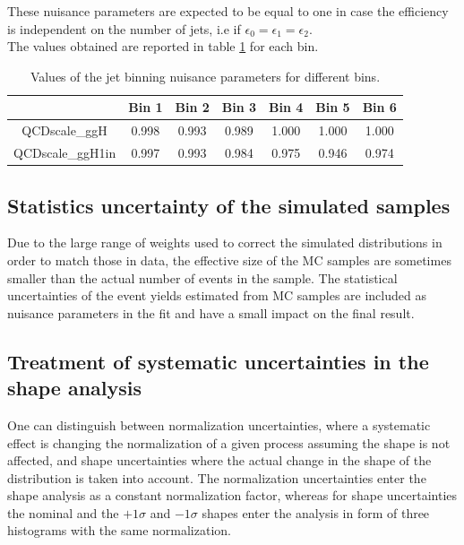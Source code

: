 These nuisance parameters are expected to be equal to one in case the efficiency is independent on the number of jets, i.e if $\epsilon_0 = \epsilon_1 = \epsilon_2$.\\
The values obtained are reported in table \ref{table:jet_binning_meas} for each \pth bin.

\begin{table}[h]
\caption{Values of the jet binning nuisance parameters for different \pth bins.}
\label{table:jet_binning_meas}
\begin{center}
\begin{tabular}{ccccccc}
& Bin 1 & Bin 2 & Bin 3 & Bin 4  & Bin 5 & Bin 6\\
\hline
QCDscale\_ggH  & 0.998  &   0.993  &   0.989  &   1.000  &   1.000   &  1.000 \\
QCDscale\_ggH1in &0.997   &  0.993  &   0.984  &   0.975 &    0.946 &    0.974  \\
\end{tabular}
\end{center}
\end{table}


\subsection{Statistics uncertainty of the simulated samples}

Due to the large range of weights used to correct the simulated distributions in order to
match those in data, the effective size of the MC samples are sometimes smaller than
the actual number of events in the sample.
The statistical uncertainties of the event yields estimated from MC samples
are included as nuisance parameters in the fit and have a small impact on the final result.

\subsection{Treatment of systematic uncertainties in the shape analysis}

One can distinguish between normalization uncertainties, where a systematic
effect is changing the normalization of a given process assuming the shape is not affected, and
shape uncertainties where the actual change in the shape of the distribution is
taken into account. The normalization uncertainties enter the shape analysis as
a constant normalization factor, whereas for shape uncertainties the nominal and
the $+1\sigma$ and $-1\sigma$ shapes enter the analysis in form of three histograms
with the same normalization. 

